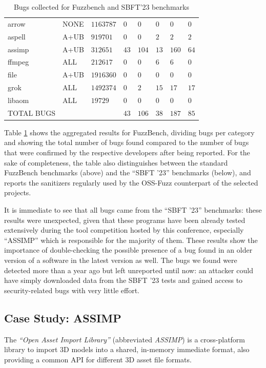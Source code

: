 \begin{table}[h]
{\begin{tabular}{|l|l|l|l|l|l|l|l|}
\hline
arrow   &NONE   &$1163787$   &$0$   &$0$   &$0$   &$0$   &$0$ \\
aspell   &A+UB   &$919701$   &$0$   &$0$   &$2$   &$2$   &$2$ \\
assimp   &A+UB   &$312651$   &$43$   &$104$   &$13$   &$160$   &$64$ \\
ffmpeg   &ALL   &$212617$   &$0$   &$0$   &$6$   &$6$   &$0$ \\
file   &A+UB   &$1916360$   &$0$   &$0$   &$0$   &$0$   &$0$ \\
grok   &ALL   &$1492374$   &$0$   &$2$   &$15$   &$17$   &$17$ \\
libaom   &ALL   &$19729$   &$0$   &$0$   &$0$   &$0$   &$0$ \\
\hline
TOTAL BUGS   &   &   &$43$   &$106$   &$38$   &$187$   &$85$          \\
\hline
\end{tabular}}
\vspace{10pt}
\caption{Bugs collected for Fuzzbench and SBFT'23 benchmarks}
\label{fuzzbench-table}
\end{table}
Table \ref{fuzzbench-table} shows the aggregated results for FuzzBench, dividing bugs per category and showing the total number of bugs found compared to the number of bugs that were confirmed by the respective developers after being reported. For the sake of completeness, the table also distinguishes between the standard FuzzBench benchmarks (above) and the ``SBFT '23'' benchmarks (below), and reports the sanitizers regularly used by the OSS-Fuzz counterpart of the selected projects.

It is immediate to see that all bugs came from the ``SBFT '23'' benchmarks: these results were unexpected, given that these programs have been already tested extensively during the tool competition hosted by this conference, especially ``ASSIMP'' which is responsible for the majority of them. These results show the importance of double-checking the possible presence of a bug found in an older version of a software in the latest version as well. The bugs we found were detected more than a year ago but left unreported until now: an attacker could have simply downloaded data from the SBFT '23 tests and gained access to security-related bugs with very little effort.



\subsection{Case Study: ASSIMP}
The \textit{``Open Asset Import Library''} (abbreviated \textit{ASSIMP}) \cite{assimp} is a cross-platform library to import 3D models into a shared, in-memory immediate format, also providing a common API for different 3D asset file formats.


